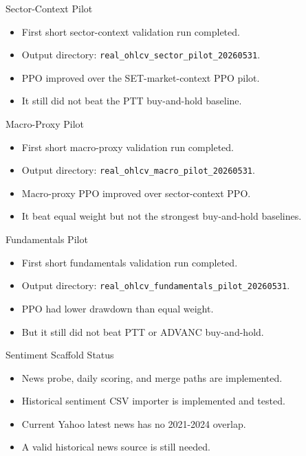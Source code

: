 \documentclass[aspectratio=43,10pt]{beamer}
\begin{document}
\begin{frame}{Sector-Context Pilot}
\begin{itemize}
  \item First short sector-context validation run completed.
  \item Output directory: \texttt{real\_ohlcv\_sector\_pilot\_20260531}.
  \item PPO improved over the SET-market-context PPO pilot.
  \item It still did not beat the PTT buy-and-hold baseline.
\end{itemize}
\end{frame}

\begin{frame}{Macro-Proxy Pilot}
\begin{itemize}
  \item First short macro-proxy validation run completed.
  \item Output directory: \texttt{real\_ohlcv\_macro\_pilot\_20260531}.
  \item Macro-proxy PPO improved over sector-context PPO.
  \item It beat equal weight but not the strongest buy-and-hold baselines.
\end{itemize}
\end{frame}

\begin{frame}{Fundamentals Pilot}
\begin{itemize}
  \item First short fundamentals validation run completed.
  \item Output directory: \texttt{real\_ohlcv\_fundamentals\_pilot\_20260531}.
  \item PPO had lower drawdown than equal weight.
  \item But it still did not beat PTT or ADVANC buy-and-hold.
\end{itemize}
\end{frame}

\begin{frame}{Sentiment Scaffold Status}
\begin{itemize}
  \item News probe, daily scoring, and merge paths are implemented.
  \item Historical sentiment CSV importer is implemented and tested.
  \item Current Yahoo latest news has no 2021-2024 overlap.
  \item A valid historical news source is still needed.
\end{itemize}
\end{frame}
\end{document}
